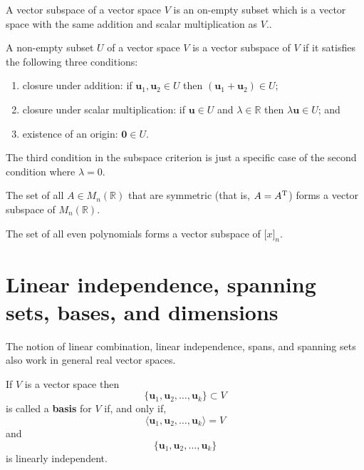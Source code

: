 \begin{definition}
    A vector subspace of a vector space $V$ is an on-empty subset which is a vector space with the same addition and scalar multiplication as $V$..
\end{definition}

\begin{definition}
    A non-empty subset $U$ of a vector space $V$ is a vector subspace of $V$ if it satisfies the following three conditions:
    \begin{enumerate}
        \item closure under addition: if $\bm{u}_1, \bm{u}_2 \in U$ then $(\bm{u}_1 + \bm{u}_2) \in U$;
        \item closure under scalar multiplication: if $\bm{u} \in U$ and $\lambda \in \mathbb{R}$ then $\lambda \bm{u} \in U$; and
        \item existence of an origin: $\bm{0} \in U$.
    \end{enumerate}
\end{definition}

\begin{remark}
    The third condition in the subspace criterion is just a specific case of the second condition where $\lambda = 0$.
\end{remark}

\begin{example}
    The set of all $A \in M_{n}(\mathbb{R})$ that are symmetric (that is, $A = A^{\rm{T}}$) forms a vector subspace of $M_n(\mathbb{R})$.
\end{example}

\begin{example}
    The set of all even polynomials forms a vector subspace of $\mathbb[x]_n$.
\end{example}

\section{Linear independence, spanning sets, bases, and dimensions}

The notion of linear combination, linear independence, spans, and spanning sets also work in general real vector spaces.

\begin{definition}
    If $V$ is a vector space then \[\{\bm{u}_1, \bm{u}_2, \ldots, \bm{u}_k\} \subset V\] is called a \textbf{basis} for $V$ if, and only if, \[\langle \bm{u}_1, \bm{u}_2, \ldots, \bm{u}_k \rangle = V\] and \[\{\bm{u}_1, \bm{u}_2, \ldots, \bm{u}_k\}\] is linearly independent.
\end{definition}

